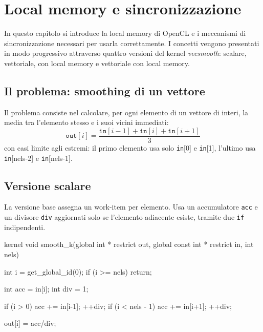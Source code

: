 \chapter{Local memory e sincronizzazione}\label{chap:opencl_lmem}

In questo capitolo si introduce la local memory di OpenCL e i meccanismi di sincronizzazione necessari per usarla correttamente. I concetti vengono presentati in modo progressivo attraverso quattro versioni del kernel \emph{vecsmooth}: scalare, vettoriale, con local memory e vettoriale con local memory.

\section{Il problema: smoothing di un vettore}\label{sec:opencl_lmem_problema}

Il problema consiste nel calcolare, per ogni elemento di un vettore di interi, la media tra l'elemento stesso e i suoi vicini immediati:
\[
\texttt{out}[i] = \frac{\texttt{in}[i-1] + \texttt{in}[i] + \texttt{in}[i+1]}{3}
\]
con casi limite agli estremi: il primo elemento usa solo \texttt{in}[0] e \texttt{in}[1], l'ultimo usa \texttt{in}[nels-2] e \texttt{in}[nels-1].

\section{Versione scalare}\label{sec:opencl_lmem_smooth_base}

La versione base assegna un work-item per elemento. Usa un accumulatore \texttt{acc} e un divisore \texttt{div} aggiornati solo se l'elemento adiacente esiste, tramite due \texttt{if} indipendenti.

\begin{code}[caption={Kernel smooth scalare}, label={code:smooth_k}]
kernel void smooth_k(global int * restrict out,
                     global const int * restrict in, int nels)
{
    int i = get_global_id(0);
    if (i >= nels) return;

    int acc = in[i];
    int div = 1;

    if (i > 0) {
        acc += in[i-1];
        ++div;
    }
    if (i < nels - 1) {
        acc += in[i+1];
        ++div;
    }

    out[i] = acc/div;
}
\end{code}

